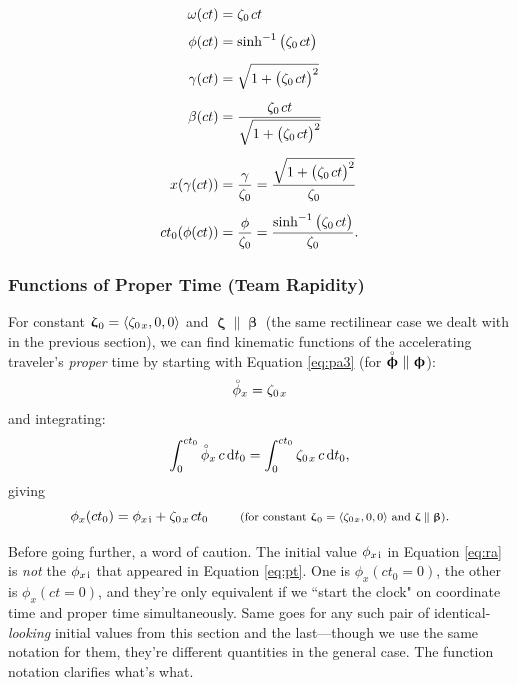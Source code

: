 \documentclass[12pt]{article}
\renewcommand{\mathring}[1]{\accentset{\circ}{#1}}
\newcommand{\dd}[1]{\mathrm{d}#1}
\newcommand{\vvbeta}{\bm{\upbeta}}
\newcommand{\vvphi}{\bm{\upphi}}
\newcommand{\vvzeta}{\bm{\upzeta}}
\begin{document}
\begin{equation*}
\begin{aligned}
\omega (ct) &= \zeta_0 \mkern2mu ct \\[3pt]
\phi (ct) &= \sinh^{-1} \big( \zeta_0 \mkern2mu ct \big) \\[5pt]
\gamma (ct) &= \sqrt{1 + \big( \zeta_0 \mkern2mu ct \big)^2} \\[5pt]
\beta (ct) &= \dfrac{\zeta_0 \mkern2mu ct}{\sqrt{1 + \big( \zeta_0 \mkern2mu ct \big)^2}} \\[5pt]
x (\gamma(ct)) &= \dfrac{ \gamma }{ \zeta_0} = \dfrac{\sqrt{1 + \big( \zeta_0 \mkern2mu ct \big)^2}}{ \zeta_0} \\[5pt]
ct_0 (\phi(ct)) &= \dfrac{ \phi }{ \zeta_0} = \dfrac{\sinh^{-1} \big( \zeta_0 \mkern2mu ct \big)}{ \zeta_0}.
\end{aligned}
\end{equation*}


\subsubsection{Functions of Proper Time (Team Rapidity)}

For constant $\vvzeta_{\mkern1mu 0} = \langle \zeta_{0 \mkern2mu x} , 0, 0 \rangle$ and $\vvzeta \parallel \vvbeta$ (the same rectilinear case we dealt with in the previous section), we can find kinematic functions of the accelerating traveler's \emph{proper} time by starting with Equation \ref{eq:pa3} (for $\mathring{\vvphi} \parallel \vvphi$):
\begin{equation*}
\mathring{\phi}_x = \zeta_{0 \mkern2mu x}
\end{equation*}
and integrating:
\begin{equation*}
\int_0^{ct_0} \mathring{\phi}_x \, c \, \dd t_0 = \int_0^{ct_0}  \zeta_{0 \mkern2mu x} \, c \, \dd t _0 ,
\end{equation*}
giving
\begin{equation}\label{eq:ra}
\phi_x (ct_0) = \phi_{x \mkern2mu \textrm{i} } + \zeta_{0 \mkern2mu x} \mkern2mu ct_0 \qquad \textrm{\footnotesize{ (for constant $\vvzeta_{\mkern1mu 0} = \langle \zeta_{0 \mkern1mu x} , 0, 0 \rangle$ and $\vvzeta \parallel \vvbeta$)}}.
\end{equation}

Before going further, a word of caution. The initial value $\phi_{x \mkern2mu \textrm{i} }$ in Equation \ref{eq:ra} is \emph{not} the $\phi_{x \mkern2mu \textrm{i} }$ that appeared in Equation \ref{eq:pt}. One is $\phi_x (ct_0 = 0)$, the other is $\phi_x (ct = 0)$, and they're only equivalent if we ``start the clock" on coordinate time and proper time simultaneously. Same goes for any such pair of identical-\emph{looking} initial values from this section and the last---though we use the same notation for them, they're different quantities in the general case. The function notation clarifies what's what.
\end{document}
